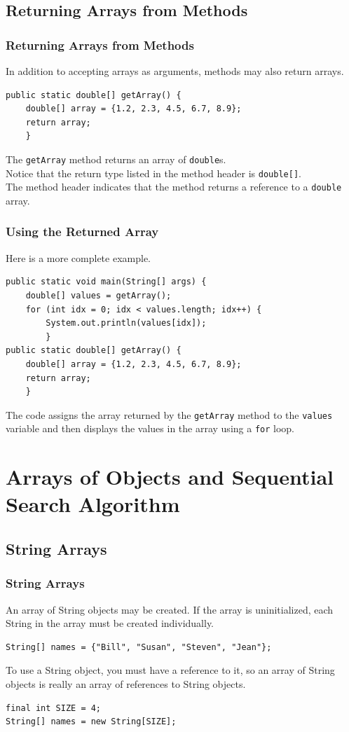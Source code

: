 \documentclass[11pt]{beamer}
\begin{document}
\subsection{Returning Arrays from Methods}
\begin{frame}[fragile]
    \frametitle{Returning Arrays from Methods}
    In addition to accepting arrays as arguments, methods may also return arrays.
    \begin{lstlisting}
public static double[] getArray() {
    double[] array = {1.2, 2.3, 4.5, 6.7, 8.9};
    return array;
    }
    \end{lstlisting}
    The \texttt{getArray} method returns an array of \texttt{double}s. \\ \vspace{1em}
    Notice that the return type listed in the method header is \texttt{double[]}. \\ \vspace{1em} 
    The method header indicates that the method returns a reference to a \texttt{double} array.
\end{frame}

\begin{frame}[fragile]
    \frametitle{Using the Returned Array}
    Here is a more complete example.
    \begin{lstlisting}
public static void main(String[] args) {
    double[] values = getArray();
    for (int idx = 0; idx < values.length; idx++) {
        System.out.println(values[idx]);
        }
public static double[] getArray() {
    double[] array = {1.2, 2.3, 4.5, 6.7, 8.9};
    return array;
    }
    \end{lstlisting}
    The code assigns the array returned by the \texttt{getArray} method to the \texttt{values} variable and then displays the values in the array using a \texttt{for} loop.
\end{frame}

\section{Arrays of Objects and Sequential Search Algorithm}
\subsection{String Arrays}
\begin{frame}[fragile]
    \frametitle{String Arrays}
    An array of String objects may be created. If the array is uninitialized, each String in the array must be created individually.
    \begin{lstlisting}
String[] names = {"Bill", "Susan", "Steven", "Jean"};
    \end{lstlisting}
    To use a String object, you must have a reference to it, so an array of String objects is really an array of references to String objects.
    \begin{lstlisting}
final int SIZE = 4;
String[] names = new String[SIZE];
    \end{lstlisting}
\end{frame}
\end{document}
